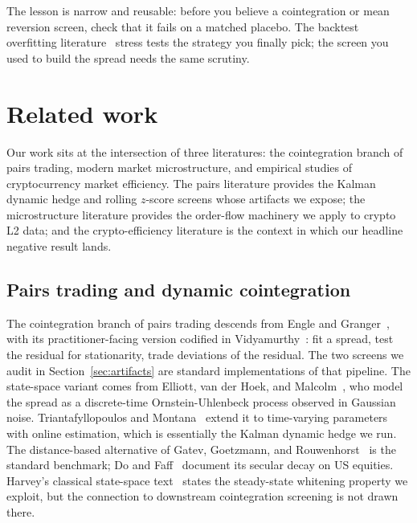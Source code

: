 \documentclass[11pt]{article}
\begin{document}
The lesson is narrow and reusable: before you believe a cointegration or mean reversion screen,
check that it fails on a matched placebo. The backtest overfitting
literature~\cite{bailey2014dsr} stress tests the strategy you finally pick;
the screen you used to build the spread needs the same scrutiny.

\section{Related work}
\label{sec:related}

Our work sits at the intersection of three literatures: the cointegration branch of pairs
trading, modern market microstructure, and empirical studies of cryptocurrency market
efficiency. The pairs literature provides the Kalman dynamic hedge and rolling $z$-score
screens whose artifacts we expose; the microstructure literature provides the order-flow
machinery we apply to crypto L2 data; and the crypto-efficiency literature is the context
in which our headline negative result lands.

\subsection{Pairs trading and dynamic cointegration}
\label{sec:related-pairs}

The cointegration branch of pairs trading descends from Engle and
Granger~\cite{engle1987cointegration}, with its practitioner-facing version codified in
Vidyamurthy~\cite{vidyamurthy2004pairs}: fit a spread, test the residual for stationarity,
trade deviations of the residual. The two screens we audit in Section~\ref{sec:artifacts}
are standard implementations of that pipeline. The state-space variant comes from Elliott,
van der Hoek, and Malcolm~\cite{elliott2005pairs}, who model the spread as a discrete-time
Ornstein-Uhlenbeck process observed in Gaussian noise. Triantafyllopoulos and
Montana~\cite{triantafyllopoulos2011dynamic} extend it to time-varying parameters with
online estimation, which is essentially the Kalman dynamic hedge we run. The distance-based
alternative of Gatev, Goetzmann, and Rouwenhorst~\cite{gatev2006pairs} is the standard
benchmark; Do and Faff~\cite{do2010simple} document its secular decay on US equities.
Harvey's classical state-space text~\cite{harvey1989structural} states the steady-state
whitening property we exploit, but the connection to downstream cointegration screening is
not drawn there.
\end{document}
